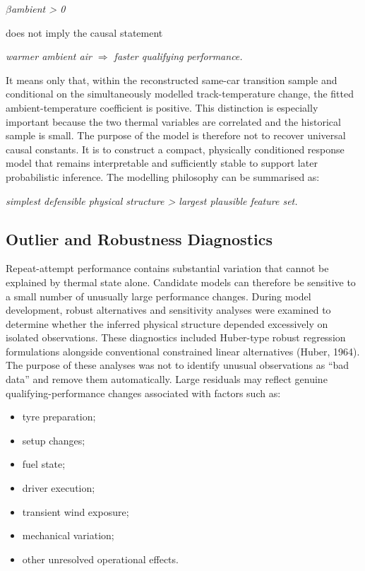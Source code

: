 \begin{center}\textit{\ensuremath{\beta}ambient > 0}\end{center}

does not imply the causal statement

\begin{center}\textit{warmer ambient air \ensuremath{\Rightarrow} faster qualifying performance.}\end{center}

It means only that, within the reconstructed same-car transition sample and conditional on the simultaneously modelled track-temperature change, the fitted ambient-temperature coefficient is positive. This distinction is especially important because the two thermal variables are correlated and the historical sample is small. The purpose of the model is therefore not to recover universal causal constants. It is to construct a compact, physically conditioned response model that remains interpretable and sufficiently stable to support later probabilistic inference. The modelling philosophy can be summarised as:

\begin{center}\textit{simplest defensible physical structure > largest plausible feature set.}\end{center}

\subsection{Outlier and Robustness Diagnostics}
Repeat-attempt performance contains substantial variation that cannot be explained by thermal state alone. Candidate models can therefore be sensitive to a small number of unusually large performance changes. During model development, robust alternatives and sensitivity analyses were examined to determine whether the inferred physical structure depended excessively on isolated observations. These diagnostics included Huber-type robust regression formulations alongside conventional constrained linear alternatives (Huber, 1964). The purpose of these analyses was not to identify unusual observations as ``bad data'' and remove them automatically. Large residuals may reflect genuine qualifying-performance changes associated with factors such as:

\begin{itemize}
\item tyre preparation;
\item setup changes;
\item fuel state;
\item driver execution;
\item transient wind exposure;
\item mechanical variation;
\item other unresolved operational effects.
\end{itemize}

